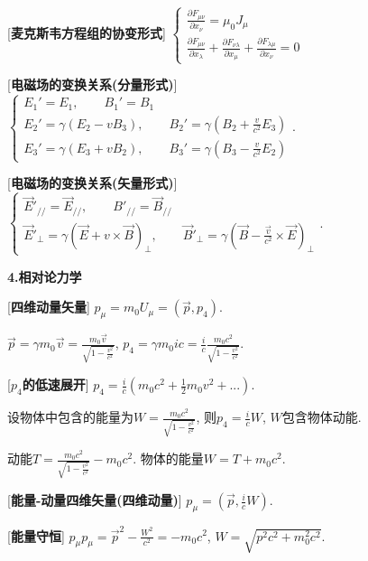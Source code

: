 [\textbf{麦克斯韦方程组的协变形式}] $\begin{cases}\frac{\partial F_{\mu\nu}}{\partial x_\nu}=\mu_0J_\mu\\\frac{\partial F_{\mu\nu}}{\partial x_\lambda}+\frac{\partial F_{\nu\lambda}}{\partial x_\mu}+\frac{\partial F_{\lambda\mu}}{\partial x_\nu}=0\end{cases}$

[\textbf{电磁场的变换关系(分量形式)}] $\begin{cases}E_1'=E_1,\qquad B_1'=B_1\\E_2'=\gamma(E_2-vB_3),\qquad B_2'=\gamma(B_2+\frac{v}{c^2}E_3)\\E_3'=\gamma(E_3+vB_2),\qquad B_3'=\gamma(B_3-\frac{v}{c^2}E_2)\end{cases}$.\par

\clearpage

[\textbf{电磁场的变换关系(矢量形式)}] $\begin{cases}\vec E'_{//}=\vec E_{//},\qquad B'_{//}=\vec B_{//}\\\vec E'_{\perp}=\gamma(\vec E+v\times\vec B)_{\perp},\qquad \vec B'_{\perp}=\gamma(\vec B-\frac{\vec v}{c^2}\times\vec E)_{\perp}\end{cases}$.\par

\begin{center}
 \textbf{4.相对论力学}
\end{center}

[\textbf{四维动量矢量}] $p_\mu=m_0U_\mu=(\vec p,p_4)$.\par
\qquad $\vec p=\gamma m_0\vec v=\frac{m_0\vec v}{\sqrt{1-\frac{v^2}{c^2}}}$, $p_4=\gamma m_0ic=\frac{i}{c}\frac{m_0c^2}{\sqrt{1-\frac{v^2}{c^2}}}$.\par

[\textbf{$p_4$的低速展开}] $p_4=\frac{i}{c}(m_0c^2+\frac{1}{2}m_0v^2+...)$.\par
\qquad 设物体中包含的能量为$W=\frac{m_0c^2}{\sqrt{1-\frac{v^2}{c^2}}}$, 则$p_4=\frac{i}{c}W$, $W$包含物体动能. \par
动能$T=\frac{m_0c^2}{\sqrt{1-\frac{v^2}{c^2}}}-m_0c^2$. 物体的能量$W=T+m_0c^2$.\par

[\textbf{能量-动量四维矢量(四维动量)}] $p_\mu=(\vec p,\frac{i}{c}W)$.\par

[\textbf{能量守恒}] $p_\mu p_\mu=\vec p^2-\frac{W^2}{c^2}=-m_0c^2$, $W=\sqrt{p^2c^2+m_0^2c^2}$.\par

